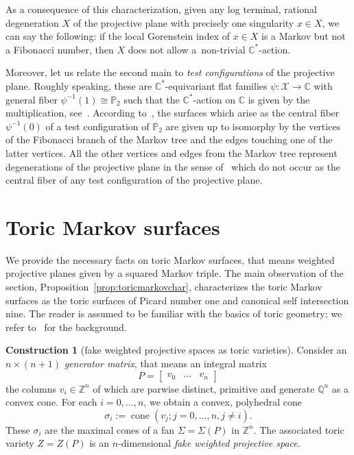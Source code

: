 \documentclass[10pt,a4paper]{amsart}
\theoremstyle{definition}
\newtheorem{constr}[thm]{Construction}
\def\CC{{\mathbb C}}
\def\ZZ{{\mathbb Z}}
\def\QQ{{\mathbb Q}}
\def\PP{{\mathbb P}}
\DeclareMathOperator{\cone}{cone}
\begin{document}
As a consequence of this characterization,
given any log terminal, rational degeneration $X$
of the projective plane with precisely one
singularity $x \in X$, we can say the following:
if the local Gorenstein index of $x \in X$ is a
Markov but not a Fibonacci number, then $X$ does
not allow a~non-trivial $\CC^*$-action.

Moreover, let us relate the second main to
\emph{test configurations} of the projective plane.
Roughly speaking, these are $\CC^*$-equivariant
flat families $\psi \colon \mathcal{X} \to \CC$
with general fiber $\psi^{-1}(1) \cong \PP_2$ such
that the $\CC^*$-action on $\CC$ is given by the
multiplication, see~\cite[Definition~A.1]{AsBeEtAl}.
According to~\mbox{\cite[Theorem~A.3]{AsBeEtAl}}, the surfaces
which arise as the central fiber $\psi^{-1}(0)$ of a test
configuration of $\PP_2$ are given up to isomorphy
by the vertices of the Fibonacci branch of
the Markov tree and the edges touching one of the latter
vertices.
All the other vertices and edges from the Markov tree
represent degenerations of the projective plane in the
sense of~\cite[Definition~1]{Ma} which do not occur as the
central fiber of any test configuration of the
projective plane.






\section{Toric Markov surfaces}


We provide the necessary facts on toric Markov surfaces,
that means weighted projective planes given by a squared
Markov triple.
The main observation of the section,
Proposition~\ref{prop:toricmarkovchar},
characterizes the toric Markov surfaces as the
toric surfaces of Picard number one and canonical
self intersection nine.
The reader is assumed to be familiar with the basics of
toric geometry; we refer to~\cite{CoLiSc} for the
background.

\begin{constr}[fake weighted projective spaces as toric varieties]
\label{constr:fwps}
Consider an $n \times (n+1)$ \emph{generator matrix},
that means an integral matrix
\[
P = \begin{bmatrix} v_0 & \dots & v_n \end{bmatrix}
\]
the columns $v_i \in \ZZ^n$ of which are parwise distinct,
primitive and generate $\QQ^n$ as a convex cone.
For each $i = 0, \dots, n$, we obtain a convex,
polyhedral cone
\[
\sigma_i := \cone(v_j; j = 0, \dots, n, j \ne i).
\]
These $\sigma_i$ are the maximal cones of a
fan $\Sigma = \Sigma(P)$ in $\ZZ^n$.
The associated toric variety $Z=Z(P)$ is an
$n$-dimensional \emph{fake weighted projective space}.
\end{constr}
\end{document}
